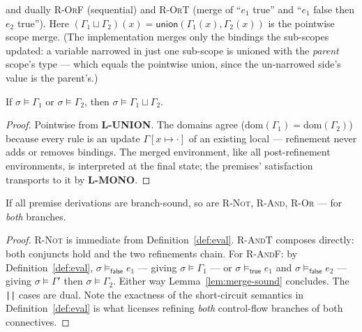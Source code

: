 \documentclass[11pt]{article}
\newcommand{\Env}{\Gamma}
\newcommand{\RefineT}[3]{#1 \vdash #2 \stackrel{\mathsf{t}}{\rightsquigarrow} #3}
\newcommand{\RefineF}[3]{#1 \vdash #2 \stackrel{\mathsf{f}}{\rightsquigarrow} #3}
\newcommand{\RefineB}[4]{#1 \vdash #2 \stackrel{#4}{\rightsquigarrow} #3}
\begin{document}
and dually \textsc{R-OrF} (sequential) and \textsc{R-OrT} (merge of
``$e_1$ true'' and ``$e_1$ false then $e_2$ true''). Here
$(\Env_1 \sqcup \Env_2)(x) = \mathsf{union}(\Env_1(x), \Env_2(x))$ is the
pointwise scope merge. (The implementation merges only the bindings the
sub-scopes updated: a variable narrowed in just one sub-scope is unioned
with the \emph{parent} scope's type — which equals the pointwise union,
since the un-narrowed side's value is the parent's.)

\begin{lemma}
\label{lem:merge-sound}
If $\sigma \models \Env_1$ or $\sigma \models \Env_2$, then
$\sigma \models \Env_1 \sqcup \Env_2$.
\end{lemma}
\begin{proof}
Pointwise from \textbf{L-UNION}. The domains agree
($\mathrm{dom}(\Env_1) = \mathrm{dom}(\Env_2)$) because every rule is an
update $\Env[x \mapsto \cdot]$ of an existing local — refinement never adds
or removes bindings. The merged environment, like all post-refinement
environments, is interpreted at the final state; the premises' satisfaction
transports to it by \textbf{L-MONO}.
\end{proof}

\begin{lemma}
\label{lem:connectives-sound}
If all premise derivations are branch-sound, so are
\textsc{R-Not}, \textsc{R-And}, \textsc{R-Or} — for \emph{both} branches.
\end{lemma}
\begin{proof}
\textsc{R-Not} is immediate from Definition~\ref{def:eval}.
\textsc{R-AndT} composes directly: both conjuncts hold and the two
refinements chain. For \textsc{R-AndF}: by Definition~\ref{def:eval},
$\sigma \models_{\mathsf{false}} e_1$ — giving $\sigma \models \Env_1$ — or
$\sigma \models_{\mathsf{true}} e_1$ and
$\sigma \models_{\mathsf{false}} e_2$ — giving $\sigma \models \Env'$ then
$\sigma \models \Env_2$. Either way Lemma~\ref{lem:merge-sound} concludes.
The \texttt{||} cases are dual. Note the exactness of the short-circuit
semantics in Definition~\ref{def:eval} is what licenses refining
\emph{both} control-flow branches of both connectives.
\end{proof}
\end{document}
